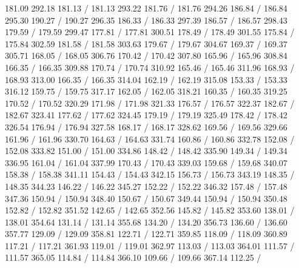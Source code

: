{ 181.09 292.18 181.13 /
 181.13 293.22 181.76 /
 181.76 294.26 186.84 /
 186.84 295.30 190.27 /
 190.27 296.35 186.33 /
 186.33 297.39 186.57 /
 186.57 298.43 179.59 /
 179.59 299.47 177.81 /
 177.81 300.51 178.49 /
 178.49 301.55 175.84 /
 175.84 302.59 181.58 /
 181.58 303.63 179.67 /
 179.67 304.67 169.37 /
 169.37 305.71 168.05 /
 168.05 306.76 170.42 /
 170.42 307.80 165.96 /
 165.96 308.84 166.35 /
 166.35 309.88 170.74 /
 170.74 310.92 165.46 /
 165.46 311.96 168.93 /
 168.93 313.00 166.35 /
 166.35 314.04 162.19 /
 162.19 315.08 153.33 /
 153.33 316.12 159.75 /
 159.75 317.17 162.05 /
 162.05 318.21 160.35 /
 160.35 319.25 170.52 /
 170.52 320.29 171.98 /
 171.98 321.33 176.57 /
 176.57 322.37 182.67 /
 182.67 323.41 177.62 /
 177.62 324.45 179.19 /
 179.19 325.49 178.42 /
 178.42 326.54 176.94 /
 176.94 327.58 168.17 /
 168.17 328.62 169.56 /
 169.56 329.66 161.96 /
 161.96 330.70 164.63 /
 164.63 331.74 160.86 /
 160.86 332.78 152.08 /
 152.08 333.82 151.00 /
 151.00 334.86 148.42 /
 148.42 335.90 149.34 /
 149.34 336.95 161.04 /
 161.04 337.99 170.43 /
 170.43 339.03 159.68 /
 159.68 340.07 158.38 /
 158.38 341.11 154.43 /
 154.43 342.15 156.73 /
 156.73 343.19 148.35 /
 148.35 344.23 146.22 /
 146.22 345.27 152.22 /
 152.22 346.32 157.48 /
 157.48 347.36 150.94 /
 150.94 348.40 150.67 /
 150.67 349.44 150.94 /
 150.94 350.48 152.82 /
 152.82 351.52 142.65 /
 142.65 352.56 145.82 /
 145.82 353.60 138.01 /
 138.01 354.64 131.14 /
 131.14 355.68 134.20 /
 134.20 356.73 136.60 /
 136.60 357.77 129.09 /
 129.09 358.81 122.71 /
 122.71 359.85 118.09 /
 118.09 360.89 117.21 /
 117.21 361.93 119.01 /
 119.01 362.97 113.03 /
 113.03 364.01 111.57 /
 111.57 365.05 114.84 /
 114.84 366.10 109.66 /
 109.66 367.14 112.25 /
}
